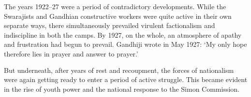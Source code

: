 \begin{multicols}{2}
The years 1922--27 were a period of contradictory developments. While the Swarajists and Gandhian constructive workers were quite active in their own separate ways, there simultaneously prevailed virulent factionalism and indiscipline in both the camps. By 1927, on the whole, an atmosphere of apathy and frustration had begun to prevail. Gandhiji wrote in May 1927: `My only hope therefore lies in prayer and answer to prayer.'

But underneath, after years of rest and recoupment, the forces of nationalism were again getting ready to enter a period of active struggle. This became evident in the rise of youth power and the national response to the Simon Commission.
\end{multicols}